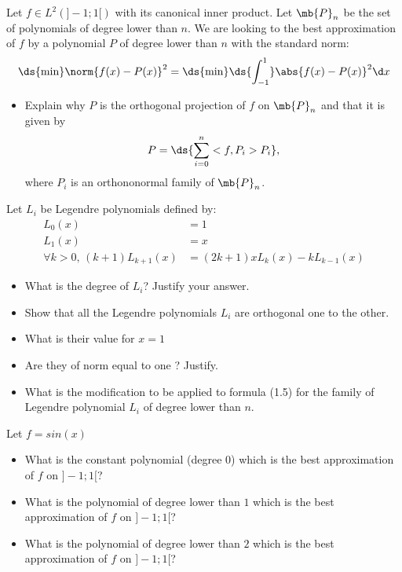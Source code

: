 \bexo
Let $f\in L^2(]-1;1[)$ with its canonical inner product. Let $\mb{P}_n$ be the set of polynomials of degree lower than $n$. We are looking to the best approximation of $f$ by a polynomial $P$ of degree lower than $n$ with the standard norm:
\begin{equation}
\ds{\min}\norm{f(x)-P(x)}^2
=
\ds{\min}\ds{\int_{-1}^1}\abs{f(x)-P(x)}^2\d x
\end{equation}


\begin{itemize}
	\item Explain why $P$ is the orthogonal projection of $f$ on $\mb{P}_n$ and that it is given by 
\begin{equation}
P=\ds{\sum_{i=0}^n <f,P_i>P_i},
\end{equation}
where $P_i$ is an orthononormal family of $\mb{P}_n$.
\end{itemize}


Let $L_i$ be Legendre polynomials defined by:
\begin{align}
	L_0(x)&=1\\
	L_1(x)&=x\\
	\forall k>0,\,(k+1)L_{k+1}(x)&=(2k+1)xL_k(x)-kL_{k-1}(x)
\end{align}

\begin{itemize}
	\item What is the degree of $L_i$? Justify your answer. 
	\item Show that all the Legendre polynomials $L_i$ are orthogonal one to the other.
	\item What is their value for $x=1$
	\item Are they of norm equal to one ? Justify. 
	\item What is the modification to be applied to formula (1.5) for the family of Legendre polynomial $L_i$ of degree lower than $n$.
\end{itemize}
Let $f=sin(x)$
\begin{itemize}
\item What is the constant polynomial (degree $0$) which is the best approximation of $f$ on $]-1;1[$?
\item What is the polynomial of degree lower than $1$ which is the best approximation of $f$ on $]-1;1[$?
\item What is the polynomial of degree lower than $2$ which is the best approximation of $f$ on $]-1;1[$?
\end{itemize}

\eexo
{}